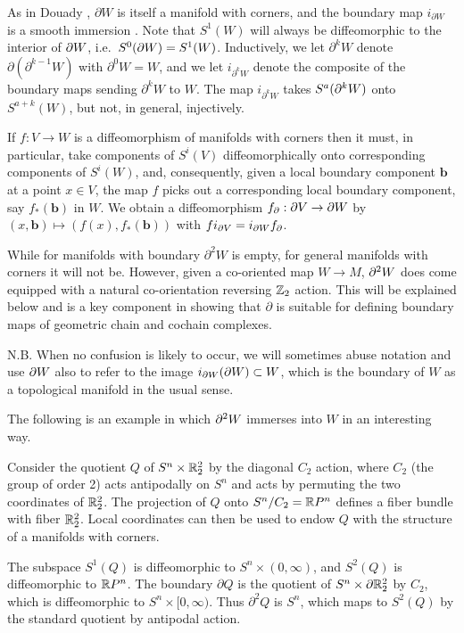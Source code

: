 As in Douady \cite{Doua61}, $\partial W$ is itself a manifold with corners, and the boundary map $i_{\partial W}$ is a smooth immersion \cite[Theorem 3.4]{Joy12}. Note that $S^1(W)$ will always be diffeomorphic to the interior of $\partial W$, i.e.\ $S^0(\partial W)=S^1(W)$.
Inductively, we let $\partial^k W$ denote $\partial (\partial^{k-1} W)$ with $\partial^0 W = W$, and we let $i_{\partial^k W}$ denote the composite of the boundary maps sending $\partial^k W$ to $W$. The map $i_{\partial^k W}$ takes $S^a(\partial^k W)$ onto $S^{a+k}(W)$, but not, in general, injectively.

\begin{remark}\label{R: bd diff}
If $f:V\to W$ is a diffeomorphism of manifolds with corners then it must, in particular, take components of $S^i(V)$ diffeomorphically onto corresponding components of $S^i(W)$, and, consequently, given a local boundary component $\mathbf{b}$ at a point $x\in V$, the map $f$ picks out a corresponding local boundary component, say $f_*(\mathbf{b})$ in $W$. We obtain a diffeomorphism $f_\partial:\partial V\to \partial W$ by $(x,\mathbf{b})\mapsto (f(x),f_*(\mathbf{b}))$ with $fi_{\partial V}= i_{\partial W} f_\partial$.
\end{remark}

While for manifolds with boundary $\partial^2W$ is empty, for general manifolds with corners it will not be.
However, given a co-oriented map $W\to M$, $\partial^2W$ does come equipped with a natural co-orientation reversing $\mathbb{Z}_2$ action.
This will be explained below and is a key component in showing that $\partial$ is suitable for defining boundary maps of geometric chain and cochain complexes.

N.B.
When no confusion is likely to occur, we will sometimes abuse notation and use $\partial W$ also to refer to the image $i_{\partial W}(\partial W)\subset W$, which is the boundary of $W$ as a topological manifold in the usual sense.

The following is an example in which $\partial^2 W$ immerses into $W$ in an interesting way.

\begin{example} \label{boundary}
	Consider the quotient $Q$ of $S^n \times \mathbb{R}^2_2$ by the diagonal $C_2$ action, where $C_2$ (the group of order 2) acts antipodally on $S^n$ and acts by permuting the two coordinates
	of $\mathbb{R}^2_2$.
	The projection of $Q$ onto $S^n / C_2 = \mathbb{R} P^n$ defines a fiber bundle with fiber $\mathbb{R}^2_2$.
	Local coordinates can then be used to endow $Q$ with the structure of a manifolds with corners.

	The subspace $S^1(Q)$ is diffeomorphic to $S^n \times (0,\infty)$, and $S^2(Q)$ is diffeomorphic to $\mathbb{R} P^n$.
	The boundary $\partial Q$ is the quotient of $S^n \times \partial \mathbb{R}^2_2$ by $C_2$, which is diffeomorphic to
	$S^n \times [0,\infty)$.
	Thus $\partial^2 Q$ is $S^n$, which maps to $S^2(Q)$ by the standard quotient by antipodal action.
\end{example}

